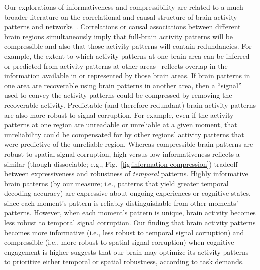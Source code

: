 \documentclass[english, 11pt]{article}
\begin{document}
Our explorations of informativeness and compressibility are related to a much
broader literature on the correlational and causal structure of brain activity
patterns and networks~\citep{PretEtal17, OwenEtal21, RogeEtal07, RubiSpor10,
SizeEtal18, SmitEtal13b, SmitEtal13c, SrinEtal07, TomaVolk11, YeoEtal11,
AdacEtal12, BassSpor17, BullSpor09, SporHone06, SporBetz16, SporZwi04,
DhamEtal08, KorzEtal08, BrovEtal04, LynnBass21, ShinEtal23}. Correlations or causal
associations between different brain regions simultaneously imply that
full-brain activity patterns will be compressible and also that those activity
patterns will contain redundancies. For example, the extent to which activity
patterns at one brain area can be inferred or predicted from activity patterns
at other areas~\citep[e.g.,][]{OwenEtal20, ScanEtal21} reflects overlap in the
information available in or represented by those brain areas. If brain patterns
in one area are recoverable using brain patterns in another area, then a
``signal'' used to convey the activity patterns could be compressed by removing
the recoverable activity. Predictable (and therefore redundant) brain activity
patterns are also more robust to signal corruption. For example, even if the
activity patterns at one region are unreadable or unreliable at a given moment,
that unreliability could be compensated for by other regions' activity patterns
that were predictive of the unreliable region. Whereas compressible brain
patterns are robust to spatial signal corruption, high versus low
informativeness reflects a similar (though dissociable; e.g.,
Fig.~\ref{fig:information-compression}) tradeoff between expressiveness and
robustness of \textit{temporal} patterns. Highly informative brain patterns (by
our measure; i.e., patterns that yield greater temporal decoding accuracy) are
expressive about ongoing experiences or cognitive states, since each moment's
pattern is reliably distinguishable from other moments' patterns. However, when
each moment's pattern is unique, brain activity becomes less robust to temporal
signal corruption. Our finding that brain activity patterns becomes more
informative (i.e., less robust to temporal signal corruption) and compressible
(i.e., more robust to spatial signal corruption) when cognitive engagement is
higher suggests that our brain may optimize its activity patterns to prioritize
either temporal or spatial robustness, according to task demands.
\end{document}
